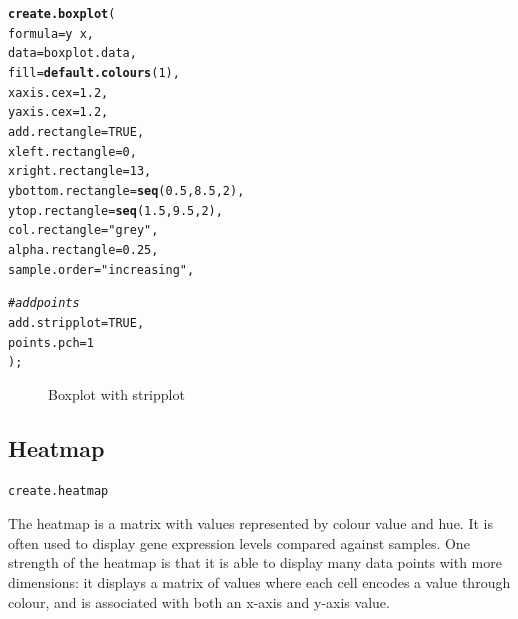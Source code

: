\documentclass[letterpaper]{report}\usepackage[]{graphicx}\usepackage[]{color}
\makeatletter
\newcommand{\hlnum}[1]{\textcolor[rgb]{0.686,0.059,0.569}{#1}}%
\newcommand{\hlstr}[1]{\textcolor[rgb]{0.192,0.494,0.8}{#1}}%
\newcommand{\hlcom}[1]{\textcolor[rgb]{0.678,0.584,0.686}{\textit{#1}}}%
\newcommand{\hlopt}[1]{\textcolor[rgb]{0,0,0}{#1}}%
\newcommand{\hlstd}[1]{\textcolor[rgb]{0.345,0.345,0.345}{#1}}%
\newcommand{\hlkwc}[1]{\textcolor[rgb]{0.333,0.667,0.333}{#1}}%
\newcommand{\hlkwd}[1]{\textcolor[rgb]{0.737,0.353,0.396}{\textbf{#1}}}%
\newenvironment{kframe}{%
 \def\at@end@of@kframe{}%
 \ifinner\ifhmode%
  \def\at@end@of@kframe{\end{minipage}}%
  \begin{minipage}{\columnwidth}%
 \fi\fi%
 \def\FrameCommand##1{\hskip\@totalleftmargin \hskip-\fboxsep
 \colorbox{shadecolor}{##1}\hskip-\fboxsep
     \hskip-\linewidth \hskip-\@totalleftmargin \hskip\columnwidth}%
 \MakeFramed {\advance\hsize-\width
   \@totalleftmargin\z@ \linewidth\hsize
   \@setminipage}}%
 {\par\unskip\endMakeFramed%
 \at@end@of@kframe}
\newenvironment{knitrout}{}{} %
\makeatother
\begin{document}
\begin{knitrout}
\color{fgcolor}\begin{kframe}
\begin{alltt}
\hlkwd{create.boxplot}\hlstd{(}
    \hlkwc{formula} \hlstd{= y} \hlopt{~} \hlstd{x,}
    \hlkwc{data} \hlstd{= boxplot.data,}
    \hlkwc{fill} \hlstd{=} \hlkwd{default.colours}\hlstd{(}\hlnum{1}\hlstd{),}
    \hlkwc{xaxis.cex} \hlstd{=} \hlnum{1.2}\hlstd{,}
    \hlkwc{yaxis.cex} \hlstd{=} \hlnum{1.2}\hlstd{,}
    \hlkwc{add.rectangle} \hlstd{=} \hlnum{TRUE}\hlstd{,}
    \hlkwc{xleft.rectangle} \hlstd{=} \hlnum{0}\hlstd{,}
    \hlkwc{xright.rectangle} \hlstd{=} \hlnum{13}\hlstd{,}
    \hlkwc{ybottom.rectangle} \hlstd{=} \hlkwd{seq}\hlstd{(}\hlnum{0.5}\hlstd{,} \hlnum{8.5}\hlstd{,} \hlnum{2}\hlstd{),}
    \hlkwc{ytop.rectangle} \hlstd{=} \hlkwd{seq}\hlstd{(}\hlnum{1.5}\hlstd{,} \hlnum{9.5}\hlstd{,} \hlnum{2}\hlstd{),}
    \hlkwc{col.rectangle} \hlstd{=} \hlstr{"grey"}\hlstd{,}
    \hlkwc{alpha.rectangle} \hlstd{=} \hlnum{0.25}\hlstd{,}
    \hlkwc{sample.order} \hlstd{=} \hlstr{"increasing"}\hlstd{,}

    \hlcom{# add points}
    \hlkwc{add.stripplot} \hlstd{=} \hlnum{TRUE}\hlstd{,}
    \hlkwc{points.pch} \hlstd{=} \hlnum{1}
    \hlstd{);}
\end{alltt}
\end{kframe}\begin{figure}

{\centering {} 

}

\caption[Boxplot with stripplot]{Boxplot with stripplot\label{fig:boxplot5}}
\end{figure}


\end{knitrout}

\subsection{Heatmap}
\begin{verbatim}
create.heatmap
\end{verbatim}

The heatmap is a matrix with values represented by colour value and hue. It is often used to display gene expression levels compared against samples. One strength of the heatmap is that it is able to display many data points with more dimensions: it displays a matrix of values where each cell encodes a value through colour, and is associated with both an x-axis and y-axis value. 
\end{document}
